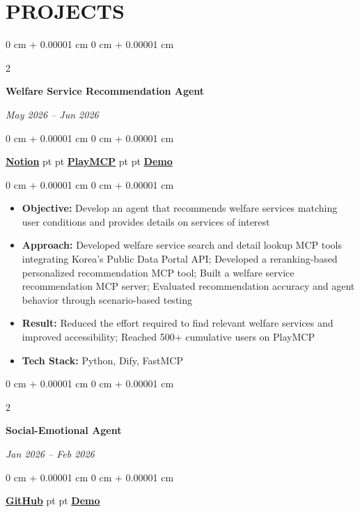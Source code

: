 \documentclass[10pt, letterpaper]{article}
\newenvironment{highlights}{
    \begin{itemize}[
        topsep=0.10 cm,
        parsep=0.10 cm,
        partopsep=0pt,
        itemsep=0pt,
        leftmargin=0 cm + 10pt
    ]
}{
    \end{itemize}
} %
\newenvironment{onecolentry}{
    \begin{adjustwidth}{
        0 cm + 0.00001 cm
    }{
        0 cm + 0.00001 cm
    }
}{
    \end{adjustwidth}
} %
\newenvironment{twocolentry}[2][]{
    \onecolentry
    \def\secondColumn{\textit{#2}}
    \setcolumnwidth{\fill, 4.5 cm}
    \begin{paracol}{2}
}{
    \switchcolumn \raggedleft \secondColumn
    \end{paracol}
    \endonecolentry
} %
\begin{document}
    \vspace{5 pt - 0.3 cm}        
    \section{PROJECTS}
        \begin{twocolentry}{
            May 2026 -- Jun 2026
        }
            \textbf{Welfare Service Recommendation Agent}
        \end{twocolentry}
        \begin{onecolentry}
            \href{https://awake-kumquat-803.notion.site/Welfare-Service-Recommendation-Agent-39f74ec8f7038090adadd81600ec3aa6?source=copy_link}{\textbf{Notion}}
             pt
            \AND
             pt
            \href{https://playmcp.kakao.com/mcp/67434660073905660}{\textbf{PlayMCP}}
             pt
            \AND
             pt
            \href{https://drive.google.com/file/d/1bJwHpEAPL_bmNNOpSlURRJnA-4vfDNOm/view?usp=sharing}{\textbf{Demo}}
        \end{onecolentry}
            
        \vspace{0.10 cm}
        \begin{onecolentry}
            \begin{highlights}
                \item \textbf{Objective:} Develop an agent that recommends welfare services matching user conditions and provides details on services of interest
                \item \textbf{Approach:} Developed welfare service search and detail lookup MCP tools integrating Korea's Public Data Portal API; Developed a reranking-based personalized recommendation MCP tool; Built a welfare service recommendation MCP server; Evaluated recommendation accuracy and agent behavior through scenario-based testing
                \item \textbf{Result:} Reduced the effort required to find relevant welfare services and improved accessibility; Reached 500+ cumulative users on PlayMCP
                \item \textbf{Tech Stack:} Python, Dify, FastMCP
            \end{highlights}
        \end{onecolentry}

        \vspace{0.2 cm}
        \begin{twocolentry}{
            Jan 2026 -- Feb 2026
        }
            \textbf{Social-Emotional Agent}
        \end{twocolentry}
        \begin{onecolentry}
            \href{https://github.com/kyoui-dev/social-emotional-agent}{\textbf{GitHub}}
             pt
            \AND
             pt
            \href{https://drive.google.com/file/d/1SS4lnZZ4xYV0Dn5OcXc2azIR1_l4dUTo/view?usp=sharing}{\textbf{Demo}}
        \end{onecolentry}
            
\end{document}
